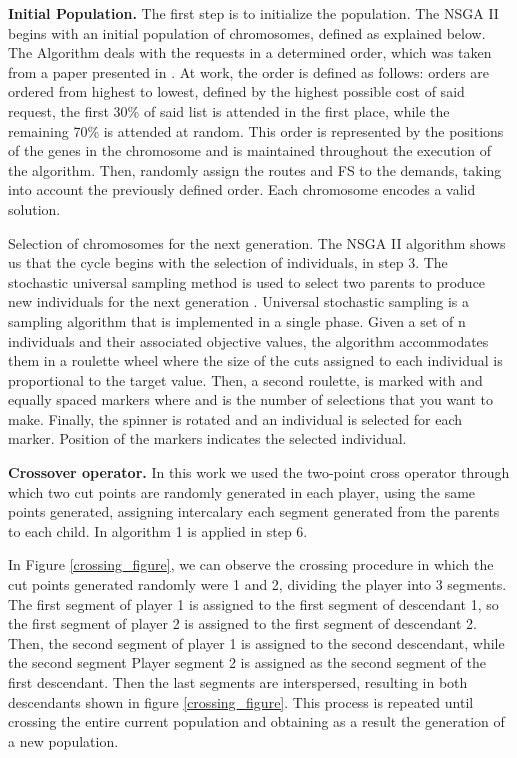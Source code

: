 \textbf{Initial Population.} The first step is to initialize the population.
The NSGA II begins with an initial population of chromosomes, defined
as explained below. The Algorithm deals with the requests in a determined
order, which was taken from a paper presented in \cite{capucho2013ilp}.
At work, the order is defined as follows: orders are ordered from
highest to lowest, defined by the highest possible cost of said request,
the first 30\% of said list is attended in the first place, while
the remaining 70\% is attended at random. This order is represented
by the positions of the genes in the chromosome and is maintained
throughout the execution of the algorithm. Then, randomly assign the
routes and FS to the demands, taking into account the previously defined
order. Each chromosome encodes a valid solution. 

Selection of chromosomes for the next generation. The NSGA II algorithm
shows us that the cycle begins with the selection of individuals,
in step 3. The stochastic universal sampling method is used to select
two parents to produce new individuals for the next generation \cite{rsa:enfoque3}.
Universal stochastic sampling is a sampling algorithm that is implemented
in a single phase. Given a set of n individuals and their associated
objective values, the algorithm accommodates them in a roulette wheel
where the size of the cuts assigned to each individual is proportional
to the target value. Then, a second roulette, is marked with and equally
spaced markers where and is the number of selections that you want
to make. Finally, the spinner is rotated and an individual is selected
for each marker. Position of the markers indicates the selected individual. 

\textbf{Crossover operator.} In this work we used the two-point cross
operator \cite{rsa:enfoque3} through which two cut points are randomly
generated in each player, using the same points generated, assigning
intercalary each segment generated from the parents to each child.
In algorithm 1 is applied in step 6. 

In Figure \ref{crossing_figure}, we can observe the crossing procedure
in which the cut points generated randomly were 1 and 2, dividing
the player into 3 segments. The first segment of player 1 is assigned
to the first segment of descendant 1, so the first segment of player
2 is assigned to the first segment of descendant 2. Then, the second
segment of player 1 is assigned to the second descendant, while the
second segment Player segment 2 is assigned as the second segment
of the first descendant. Then the last segments are interspersed,
resulting in both descendants shown in figure \ref{crossing_figure}.
This process is repeated until crossing the entire current population
and obtaining as a result the generation of a new population.

